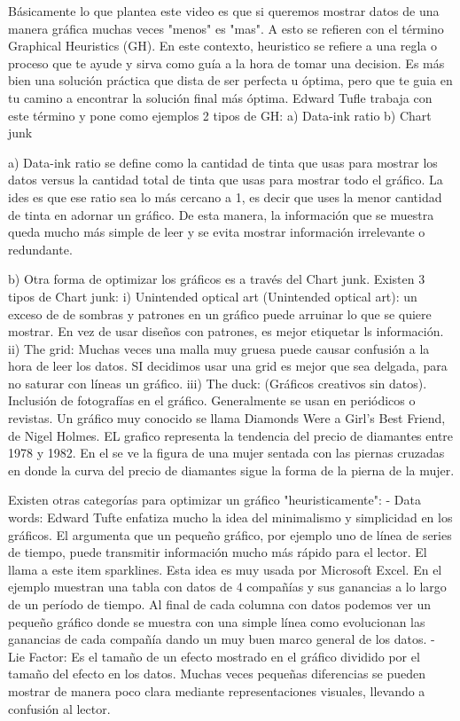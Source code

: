 Básicamente lo que plantea este video es que si queremos mostrar datos de una manera gráfica muchas veces "menos" es "mas".
A esto se refieren con el término Graphical Heuristics (GH). En este contexto, heuristico se refiere a una regla o proceso que te ayude y sirva como guía a la hora de tomar una decision.
Es más bien una solución práctica que dista de ser perfecta u óptima, pero que te guia en tu camino a encontrar la solución final más óptima.
Edward Tufle trabaja con este término y pone como ejemplos 2 tipos de GH:
a) Data-ink ratio
b) Chart junk


a) Data-ink ratio se define como la cantidad de tinta que usas para mostrar los datos versus la cantidad total de tinta que usas para mostrar todo el gráfico.
La ides es que ese ratio sea lo más cercano a 1, es decir que uses la menor cantidad de tinta en adornar un gráfico. De esta manera, la información que se muestra queda mucho más simple de leer
y se evita mostrar información irrelevante o redundante.

b) Otra forma de optimizar los gráficos es a través del Chart junk. Existen 3 tipos de Chart junk:
   i) Unintended optical art (Unintended optical art): un exceso de de sombras y patrones en un gráfico puede arruinar lo que se quiere mostrar. En vez de usar diseños con patrones, es mejor etiquetar ls información.
   ii) The grid: Muchas veces una malla muy gruesa puede causar confusión a la hora de leer los datos. SI decidimos usar una grid es mejor que sea delgada, para no saturar con líneas un gráfico.
   iii) The duck: (Gráficos creativos sin datos). Inclusión de fotografías en el gráfico. Generalmente se usan en periódicos o revistas. Un gráfico muy conocido se llama Diamonds Were a Girl's Best Friend, de Nigel Holmes. EL grafico representa la tendencia del precio de diamantes entre 1978 y 1982. En el se ve la figura de una mujer sentada con las piernas cruzadas en donde la curva del precio de diamantes sigue la forma de la pierna de la mujer.

Existen otras categorías para optimizar un gráfico "heuristicamente":
- Data words: Edward Tufte enfatiza mucho la idea del minimalismo y simplicidad en los gráficos. El argumenta que un pequeño gráfico, por ejemplo uno de línea de series de tiempo, puede transmitir información mucho más rápido para el lector. El llama a este item sparklines.
              Esta idea es muy usada por Microsoft Excel. En el ejemplo muestran una tabla con datos de 4 compañías y sus ganancias a lo largo de un período de tiempo. Al final de cada columna con datos podemos ver un pequeño gráfico donde se muestra con una simple línea como evolucionan las ganancias de cada compañía dando un muy buen marco general de los datos.
- Lie Factor: Es el tamaño de un efecto mostrado en el gráfico dividido por el tamaño del efecto en los datos.
              Muchas veces pequeñas diferencias se pueden mostrar de manera poco clara mediante representaciones visuales, llevando a confusión al lector.

